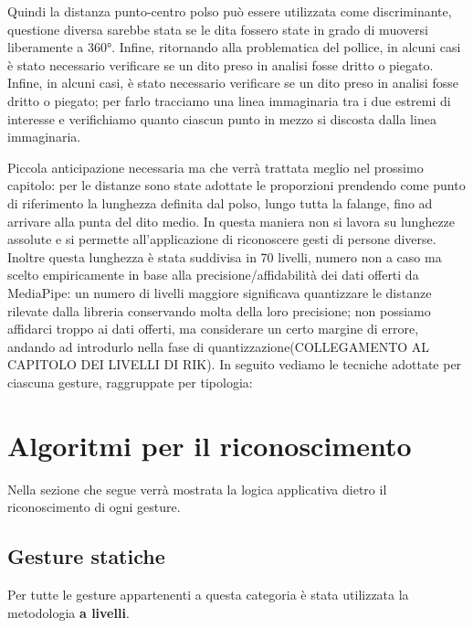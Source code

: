 \begin{multicols}{2}
\begin{multicolfigure}
    \end{multicolfigure} 
\end{multicols}
\vspace{+ 15 px}

\noindent Quindi la distanza punto-centro polso può essere utilizzata come discriminante, questione diversa sarebbe stata se le dita fossero state in grado di muoversi liberamente a 360°. Infine, ritornando alla problematica del pollice, in alcuni casi è stato necessario verificare se un dito preso in analisi fosse dritto o piegato.\\
\newpage
\noindent Infine, in alcuni casi, è stato necessario verificare se un dito preso in analisi fosse dritto o piegato; per farlo tracciamo una linea immaginaria tra i due estremi di interesse e verifichiamo quanto ciascun punto in mezzo si discosta dalla linea immaginaria.

\noindent Piccola anticipazione necessaria ma che verrà trattata meglio nel prossimo capitolo: per le distanze sono state adottate le proporzioni prendendo come punto di riferimento la lunghezza definita dal polso, lungo tutta la falange, fino ad arrivare alla punta del dito medio. In questa maniera non si lavora su lunghezze assolute e si permette all’applicazione di riconoscere gesti di persone diverse. Inoltre questa lunghezza è stata suddivisa in 70 livelli, numero non a caso ma scelto empiricamente in base alla precisione/affidabilità dei dati offerti da MediaPipe: un numero di livelli maggiore significava quantizzare le distanze rilevate dalla libreria conservando molta della loro precisione; non possiamo  affidarci troppo ai dati offerti, ma considerare un certo margine di errore, andando ad introdurlo nella fase di quantizzazione(COLLEGAMENTO AL CAPITOLO DEI LIVELLI DI RIK). In seguito vediamo le tecniche adottate per ciascuna gesture, raggruppate per tipologia:

\newpage
\section{Algoritmi per il riconoscimento}
Nella sezione che segue verrà mostrata la logica applicativa dietro il riconoscimento di ogni gesture.

\subsection{Gesture statiche}
Per tutte le gesture appartenenti a questa categoria è stata utilizzata la metodologia \textbf{a livelli}.
